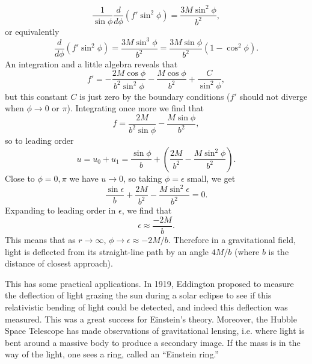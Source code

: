 $$\frac{1}{\sin\phi}\frac{d}{d\phi}(f'\sin^2\phi)=\frac{3M\sin^2\phi}{b^2},$$
or equivalently
$$\frac{d}{d\phi}(f'\sin^2\phi)=\frac{3M\sin^3\phi}{b^2}=\frac{3M\sin\phi}{b^2}(1-\cos^2\phi).$$
An integration and a little algebra reveals that
$$f'=-\frac{2M\cos\phi}{b^2\sin^2\phi}-\frac{M\cos\phi}{b^2}+\frac{C}{\sin^2\phi},$$
but this constant $C$ is just zero by the boundary conditions ($f'$ should not diverge when $\phi\to 0$ or $\pi$).
Integrating once more we find that
$$f=\frac{2M}{b^2\sin\phi} - \frac{M\sin\phi}{b^2},$$
so to leading order
$$u=u_0+u_1=\frac{\sin\phi}{b}+\left(\frac{2M}{b^2} - \frac{M\sin^2\phi}{b^2}\right).$$
Close to $\phi=0,\pi$ we have $u\to 0$, so taking $\phi=\epsilon$ small, we get
$$\frac{\sin\epsilon}{b}+\frac{2M}{b^2}-\frac{M\sin^2 \epsilon}{b^2}=0.$$ Expanding to leading order in $\epsilon$, we find that
$$\epsilon \approx \frac{-2M}{b}.$$ This means that as $r\to\infty$, $\phi\to\epsilon\approx -2M/b$.
Therefore in a gravitational field, light is deflected from its straight-line path by an angle $4M/b$ (where $b$ is the distance of closest approach).

This has some practical applications. In 1919, Eddington proposed to measure the deflection of light grazing the sun during a solar eclipse to see if this relativistic bending of light could be detected, and indeed this deflection was measured. This was a great success for Einstein's theory. Moreover, the Hubble Space Telescope has made observations of gravitational lensing, i.e. where light is bent around a massive body to produce a secondary image. If the mass is in the way of the light, one sees a ring, called an ``Einstein ring.'' 

